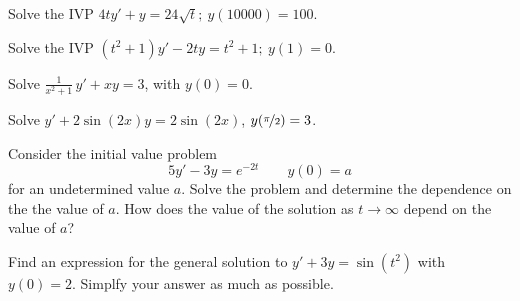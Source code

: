 \begin{exercise}
Solve the IVP $4ty'+y=24\sqrt{t};\ y(10000)=100.$ %
\end{exercise}

\begin{exercise}
Solve the IVP $(t^2+1)y' - 2ty = t^2+1; \ y(1)=0$. %
\end{exercise}

\begin{exercise}
Solve $\frac{1}{x^2+1} \, y' + x y = 3$, with $y(0) = 0$.
\end{exercise}

\begin{exercise}\ansMark%
Solve $y'+ 2\sin(2x) y = 2\sin(2x)$, $y(\nicefrac{\pi}{2}) = 3$.
\end{exercise}

\begin{exercise}
Consider the initial value problem
\[ 5y' - 3y = e^{-2t} \qquad y(0) = a \] for an undetermined value $a$. Solve the problem and determine the dependence on the the value of $a$. How does the value of the solution as $t \rightarrow \infty$ depend on the value of $a$?
\end{exercise}

\begin{exercise}
Find an expression for the general solution to $y' + 3y = \sin(t^2)$ with $y(0) = 2$. Simplfy your answer as much as possible. 
\end{exercise}

\setcounter{exercise}{100}





